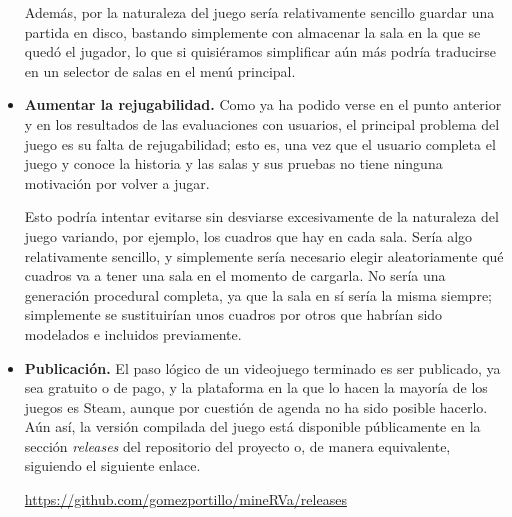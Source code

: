 \begin{itemize}
    Además, por la naturaleza del juego sería relativamente sencillo guardar una partida en disco, bastando simplemente con almacenar la sala en la que se quedó el jugador, lo que si quisiéramos simplificar aún más podría traducirse en un selector de salas en el menú principal.
    
    \item \textbf{Aumentar la rejugabilidad.} Como ya ha podido verse en el punto anterior y en los resultados de las evaluaciones con usuarios, el principal problema del juego es su falta de rejugabilidad; esto es, una vez que el usuario completa el juego y conoce la historia y las salas y sus pruebas no tiene ninguna motivación por volver a jugar. 
    
    Esto podría intentar evitarse sin desviarse excesivamente de la naturaleza del juego variando, por ejemplo, los cuadros que hay en cada sala. Sería algo relativamente sencillo, y simplemente sería necesario elegir aleatoriamente qué cuadros va a tener una sala en el momento de cargarla. No sería una generación procedural completa, ya que la sala en sí sería la misma siempre; simplemente se sustituirían unos cuadros por otros que habrían sido modelados e incluidos previamente.
    
    \item \textbf{Publicación.} El paso lógico de un videojuego terminado es ser publicado, ya sea gratuito o de pago, y la plataforma en la que lo hacen la mayoría de los juegos es Steam, aunque por cuestión de agenda no ha sido posible hacerlo. Aún así, la versión compilada del juego está disponible públicamente en la sección \textit{releases} del repositorio del proyecto o, de manera equivalente, siguiendo el siguiente enlace.
    
    \begin{center}
        \url{https://github.com/gomezportillo/mineRVa/releases}
    \end{center}
    
\end{itemize}


